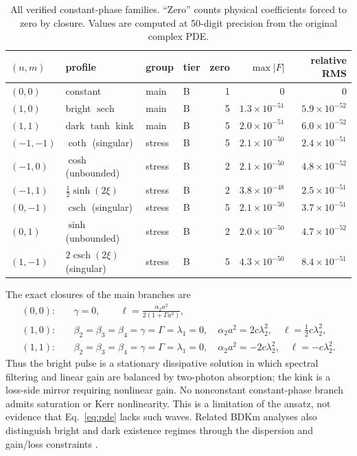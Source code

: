 \documentclass[11pt]{article}
\newcommand{\sech}{\operatorname{sech}}
\newcommand{\csch}{\operatorname{csch}}
\begin{document}
\begin{table}[t]
\centering
\caption{All verified constant-phase families.  ``Zero'' counts physical
coefficients forced to zero by closure.  Values are computed at 50-digit
precision from the original complex PDE.}
\label{tab:catalogue}
\small
\begin{tabular}{llllrrr}
\toprule
$(n,m)$ & profile & group & tier & zero & $\max|F|$ & relative RMS \\
\midrule
$(0,0)$   & constant                    & main   & B & 1 & $0$                 & $0$ \\
$(1,0)$   & bright $\sech$              & main   & B & 5 & $1.3\times10^{-51}$ & $5.9\times10^{-52}$ \\
$(1,1)$   & dark $\tanh$ kink           & main   & B & 5 & $2.0\times10^{-51}$ & $6.0\times10^{-52}$ \\
$(-1,-1)$ & $\coth$ (singular)          & stress & B & 5 & $2.1\times10^{-50}$ & $2.4\times10^{-51}$ \\
$(-1,0)$  & $\cosh$ (unbounded)         & stress & B & 2 & $2.1\times10^{-50}$ & $4.8\times10^{-52}$ \\
$(-1,1)$  & $\tfrac12\sinh(2\xi)$      & stress & B & 2 & $3.8\times10^{-48}$ & $2.5\times10^{-51}$ \\
$(0,-1)$  & $\csch$ (singular)          & stress & B & 5 & $2.1\times10^{-50}$ & $3.7\times10^{-51}$ \\
$(0,1)$   & $\sinh$ (unbounded)         & stress & B & 2 & $2.0\times10^{-50}$ & $4.7\times10^{-52}$ \\
$(1,-1)$  & $2\csch(2\xi)$ (singular)  & stress & B & 5 & $4.3\times10^{-50}$ & $8.4\times10^{-51}$ \\
\bottomrule
\end{tabular}
\end{table}

The exact closures of the main branches are
\begin{align}
(0,0):\quad &\gamma=0,\qquad
\ell=\frac{\alpha_2a^2}{2(1+\Gamma a^2)},
\label{eq:closure-constant}\\
(1,0):\quad &\beta_2=\beta_3=\beta_4=\gamma=\Gamma=\lambda_1=0,
\quad \alpha_2a^2=2c\lambda_2^2,
\quad \ell=\tfrac12c\lambda_2^2,
\label{eq:closure-sech}\\
(1,1):\quad &\beta_2=\beta_3=\beta_4=\gamma=\Gamma=\lambda_1=0,
\quad \alpha_2a^2=-2c\lambda_2^2,
\quad \ell=-c\lambda_2^2.
\label{eq:closure-kink}
\end{align}
Thus the bright pulse is a stationary dissipative solution in which spectral
filtering and linear gain are balanced by two-photon absorption; the kink is a
loss-side mirror requiring nonlinear gain.  No nonconstant constant-phase
branch admits saturation or Kerr nonlinearity.  This is a limitation of the
ansatz, not evidence that Eq.~\eqref{eq:pde} lacks such waves.  Related BDKm
analyses also distinguish bright and dark existence regimes through the
dispersion and gain/loss constraints \citep{bogning2012,ndichia2026}.
\end{document}
